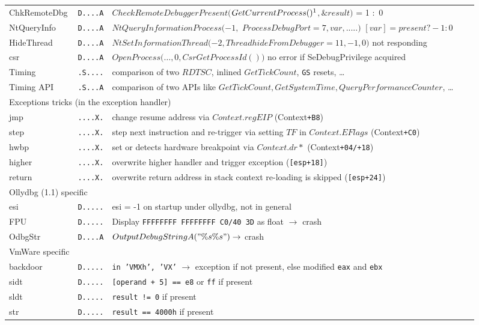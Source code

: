 \begin{tabular}{lllll}
ChkRemoteDbg		& {\tt D....A} & {\small $CheckRemoteDebuggerPresent$}$(${\small $GetCurrentProcess()\footnotemark$}$, \&result)$ = 1 :\ 0\\
NtQueryInfo			& {\tt D....A} & {\small $NtQueryInformationProcess$}$(-1,$ {\small $ProcessDebugPort =$}$ 7, var, .....)$ \ra $[var] = present ? -1:0$ \\
HideThread			& {\tt D....A} & {\small $NtSetInformationThread$}$(-2, ${\small $ThreadhideFromDebugger$}$ = 11, -1, 0)$ \ra not responding \\
csr				& {\tt D....A} & {\small $OpenProcess$}$(\ldots, 0, ${\small $CsrGetProcessId$\footnotemark}$())$ \ra no error if {\small SeDebugPrivilege} acquired \\
Timing			& {\tt .S....} & comparison of two $RDTSC$, inlined $GetTickCount$\footnotemark, {\tt GS} resets, \ldots\\
Timing API			& {\tt .S...A} & comparison of two APIs like {\small $GetTickCount, GetSystemTime, QueryPerformanceCounter$}, \ldots \rowcolors{0}{white}{lightgray}
\\
\midrule
\multicolumn{3}{l}{Exceptions tricks (in the exception handler)} \\
\midrule
jmp				& {\tt ....X.} & change resume address via $Context.regEIP$ (Context{\tt +B8})\\
step				& {\tt ....X.} & step next instruction and re-trigger via setting $TF$ in $Context.EFlags$ (Context{\tt +C0})\\
hwbp				& {\tt ....X.} & set or detects hardware breakpoint via $Context.dr*$ (Context{\tt +04/+18})\\
higher			& {\tt ....X.} & overwrite higher handler and trigger exception ({\tt [esp+18]})\\
return				& {\tt ....X.} & overwrite return address in stack \ra context re-loading is skipped ({\tt [esp+24]}) \rowcolors{0}{white}{lightgray}
\\
\midrule
\multicolumn{3}{l}{Ollydbg (1.1) specific} \\
\midrule
esi				& {\tt D.....} & esi = -1 on startup under ollydbg, not in general \\
FPU				& {\tt D.....} & Display {\tt FFFFFFFF FFFFFFFF C0/40 3D} as float $\rightarrow$ crash \\
OdbgStr			& {\tt D....A} & $OutputDebugStringA("\%s\%s") \rightarrow$ crash \rowcolors{0}{white}{lightgray}
\\ 
\midrule
VmWare specific \\
\midrule
backdoor			& {\tt D.....} & {\tt in 'VMXh', 'VX'} $\rightarrow$ exception if not present, else modified {\tt eax} and {\tt ebx} \\
sidt				& {\tt D.....} & {\tt [operand + 5] == e8} or {\tt ff} if present \\
sldt				& {\tt D.....} & {\tt result != 0} if present \\
str				& {\tt D.....} & {\tt result == 4000h} if present \rowcolors{0}{white}{lightgray}
\\
\bottomrule
\end{tabular}

